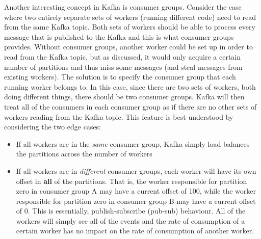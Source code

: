 Another interesting concept in Kafka is consumer groups. Consider the case where two entirely separate sets of workers (running different code) need to read from the same Kafka topic. Both sets of workers should be able to process every message that is published to the Kafka and this is what consumer groups provides. Without consumer groups, another worker could be set up in order to read from the Kafka topic, but as discussed, it would only acquire a certain number of partitions and thus miss some messages (and steal messages from existing workers). The solution is to specify the consumer group that each running worker belongs to. In this case, since there are two sets of workers, both doing different things, there should be two consumer groups. Kafka will then treat all of the consumers in each consumer group as if there are no other sets of workers reading from the Kafka topic. This feature is best understood by considering the two edge cases:

\begin{itemize}
\item{If all workers are in the \textit{same} consumer group, Kafka simply load balances the partitions across the number of workers}
\item{If all workers are in \textit{different} consumer groups, each worker will have its own offset in \textbf{all} of the partitions. That is, the worker responsible for partition zero in consumer group A may have a current offset of 100, while the worker responsible for partition zero in consumer group B may have a current offset of 0. This is essentially, publish-subscribe (pub-sub) behaviour. All of the workers will simply see all of the events and the rate of consumption of a certain worker has no impact on the rate of consumption of another worker.}
\end{itemize}

